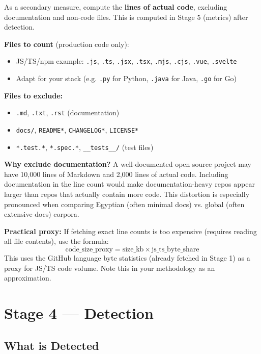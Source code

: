 \documentclass[11pt,a4paper]{article}
\begin{document}
As a secondary measure, compute the \textbf{lines of actual code}, excluding documentation and non-code files. This is computed in Stage 5 (metrics) after detection.

\textbf{Files to count} (production code only):
\begin{itemize}
    \item JS/TS/npm example: \texttt{.js}, \texttt{.ts}, \texttt{.jsx}, \texttt{.tsx}, \texttt{.mjs}, \texttt{.cjs}, \texttt{.vue}, \texttt{.svelte}
    \item Adapt for your stack (e.g. \texttt{.py} for Python, \texttt{.java} for Java, \texttt{.go} for Go)
\end{itemize}

\textbf{Files to exclude:}
\begin{itemize}
    \item \texttt{.md}, \texttt{.txt}, \texttt{.rst} (documentation)
    \item \texttt{docs/}, \texttt{README*}, \texttt{CHANGELOG*}, \texttt{LICENSE*}
    \item \texttt{*.test.*}, \texttt{*.spec.*}, \texttt{\_\_tests\_\_/} (test files)
\end{itemize}

\textbf{Why exclude documentation?} A well-documented open source project may have 10,000 lines of Markdown and 2,000 lines of actual code. Including documentation in the line count would make documentation-heavy repos appear larger than repos that actually contain more code. This distortion is especially pronounced when comparing Egyptian (often minimal docs) vs. global (often extensive docs) corpora.

\textbf{Practical proxy:} If fetching exact line counts is too expensive (requires reading all file contents), use the formula:
\[
\text{code\_size\_proxy} = \text{size\_kb} \times \text{js\_ts\_byte\_share}
\]
This uses the GitHub language byte statistics (already fetched in Stage 1) as a proxy for JS/TS code volume. Note this in your methodology as an approximation.

\section{Stage 4 — Detection}

\subsection{What is Detected}
\end{document}
